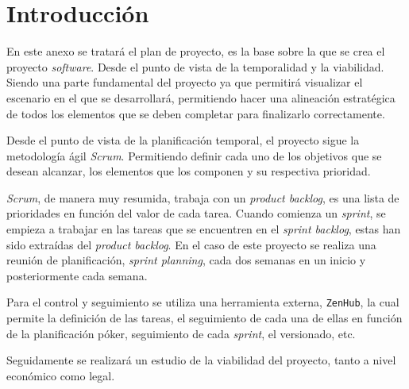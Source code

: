 \section{Introducción}
En este anexo se tratará el plan de proyecto, es la base sobre la que se crea el proyecto \textit{software}. Desde el punto de vista de la temporalidad y la viabilidad. Siendo una parte fundamental del proyecto ya que permitirá visualizar el escenario en el que se desarrollará, permitiendo hacer una alineación estratégica de todos los elementos que se deben completar para finalizarlo correctamente.

Desde el punto de vista de la planificación temporal, el proyecto sigue la metodología ágil \textit{Scrum}. Permitiendo definir cada uno de los objetivos que se desean alcanzar, los elementos que los componen y su respectiva prioridad.

\textit{Scrum}, de manera muy resumida, trabaja con un \textit{product backlog}, es una lista de prioridades en función del valor de cada tarea. Cuando comienza un \textit{sprint}, se empieza a trabajar en las tareas que se encuentren en el \textit{sprint backlog}, estas han sido extraídas del \textit{product backlog}. En el caso de este proyecto se realiza una reunión de planificación, \textit{sprint planning}, cada dos semanas en un inicio y posteriormente cada semana.

Para el control y seguimiento se utiliza una herramienta externa, \texttt{ZenHub}, la cual permite la definición de las tareas, el seguimiento de cada una de ellas en función de la planificación póker, seguimiento de cada \textit{sprint}, el versionado, etc.

Seguidamente se realizará un estudio de la viabilidad del proyecto, tanto a nivel económico como legal.
\newpage

